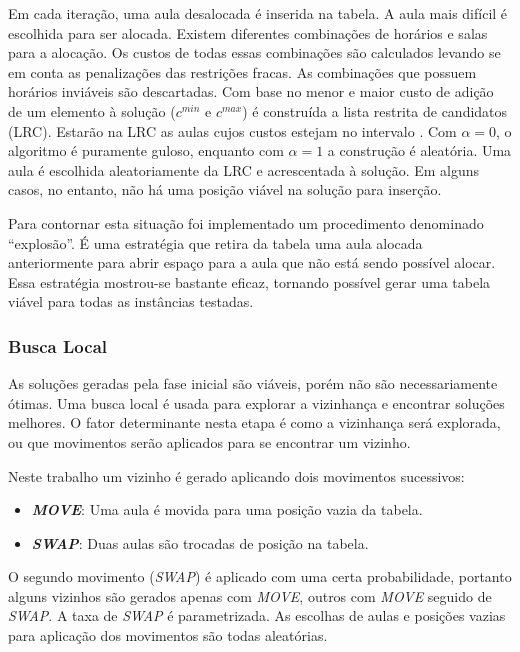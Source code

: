 \documentclass[11pt]{article}
\begin{document}
Em cada iteração, uma aula desalocada é inserida na tabela. A aula mais difícil é escolhida para ser alocada. Existem diferentes combinações de horários e salas para a alocação. Os custos de todas essas combinações são calculados levando se em conta as penalizações das restrições fracas. As combinações que possuem horários inviáveis são descartadas. Com base no menor e maior custo de adição de um elemento à solução ($c^{min}$ e $c^{max}$) é construída a lista restrita de candidatos (LRC). Estarão na LRC as aulas cujos custos estejam no intervalo \begin{math} [c^{min}, c^{min}+\alpha(c^{max} - c^{min})]\end{math}. Com $\alpha=0$, o algoritmo é puramente guloso, enquanto com $\alpha=1$ a construção é aleatória. Uma aula é escolhida aleatoriamente da LRC e acrescentada à solução. Em alguns casos, no entanto, não há uma posição viável na solução para inserção. 

Para contornar esta situação foi implementado um procedimento denominado “explosão”. É uma estratégia que retira da tabela uma aula alocada anteriormente para abrir espaço para a aula que não está sendo possível alocar. Essa estratégia mostrou-se bastante eficaz, tornando possível gerar uma tabela viável para todas as instâncias testadas.

\subsubsection{Busca Local}

As soluções geradas pela fase inicial são viáveis, porém não são necessariamente ótimas. Uma busca local é usada para explorar a vizinhança e encontrar soluções melhores. O fator determinante nesta etapa é como a vizinhança será explorada, ou que movimentos serão aplicados para se encontrar um vizinho.

Neste trabalho um vizinho é gerado aplicando dois movimentos sucessivos:

\begin{itemize}
\item \textit{\textbf{MOVE}}: Uma aula é movida para uma posição vazia da tabela.
\item \textit{\textbf{SWAP}}: Duas aulas são trocadas de posição na tabela.
\end{itemize}

O segundo movimento (\textit{SWAP}) é aplicado com uma certa probabilidade, portanto alguns vizinhos são gerados apenas com \textit{MOVE}, outros com \textit{MOVE} seguido de \textit{SWAP}. A taxa de \textit{SWAP} é parametrizada. As escolhas de aulas e posições vazias para aplicação dos movimentos são todas aleatórias.
\end{document}
